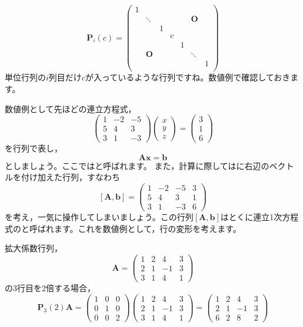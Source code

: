 \documentclass{ltjsbook}
\begin{document}
\[
	\bm{P}_i(c) = \begin{pmatrix}
		1 &        &   &   &   &        &   \\
		  & \ddots &   &   &   & \bm{O} &   \\
		  &        & 1 &   &   &        &   \\
		  &        &   & c &   &        &   \\
		  &        &   &   & 1 &        &   \\
		  & \bm{O} &   &   &   & \ddots &   \\
		  &        &   &   &   &        & 1 \\
	\end{pmatrix}
\]
単位行列の$i$列目だけ$c$が入っているような行列ですね。数値例で確認しておきます。

数値例として先ほどの連立方程式，
\[
	\begin{pmatrix} 1 & -2 & -5 \\
                5 & 4  & 3  \\
                3 & 1  & -3\end{pmatrix}
	\begin{pmatrix} x \\ y \\ z \end{pmatrix}
	=
	\begin{pmatrix} 3 \\ 1 \\ 6 \end{pmatrix}
\]
を行列で表し，
\[ \bm{Ax}=\bm{b} \]
としましょう。ここではと呼ばれます。
また，計算に際してはに右辺のベクトルを付け加えた行列，すなわち
\[
	[ \bm{A},\bm{b} ] =
	\begin{pmatrix} 1 & -2 & -5 & 3\\ 5 & 4 & 3 & 1 \\3 & 1 & -3 & 6 \end{pmatrix}
\]
を考え，一気に操作してしまいましょう。この行列$ [ \bm{A},\bm{b} ] $はとくに連立1次方程式のと呼ばれます。これを数値例として，行の変形を考えます。


拡大係数行列，
\[ \bm{A} = \begin{pmatrix} 1 & 2 & 4 & 3 \\ 2 & 1 & -1 & 3 \\ 3 & 1 & 4 & 1 \end{pmatrix} \]
の3行目を2倍する場合，
\[
	\bm{P}_3(2)\bm{A} =
	\begin{pmatrix} 1 & 0 & 0 \\ 0 & 1 & 0 \\ 0 & 0 & 2 \end{pmatrix}
	\begin{pmatrix} 1 & 2 & 4 & 3 \\ 2 & 1 & -1 & 3 \\ 3 & 1 & 4 & 1 \end{pmatrix}
	=
	\begin{pmatrix} 1 & 2 & 4 & 3 \\ 2 & 1 & -1 & 3 \\ 6 & 2 & 8 & 2 \end{pmatrix}
\]
\end{document}
